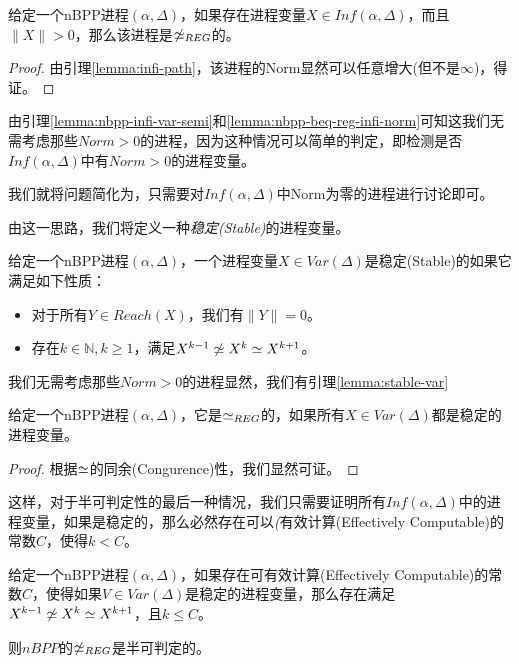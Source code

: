 \begin{lem}\label{lemma:nbpp-beq-reg-infi-norm}
给定一个nBPP进程$(\alpha,\Delta)$，如果存在进程变量$X\in Inf(\alpha,\Delta)$，而且$\|X\|>0$，那么该进程是$\not\simeq_{REG}$的。
\end{lem}

\begin{proof}
由引理\ref{lemma:infi-path}，该进程的Norm显然可以任意增大(但不是$\infty$)，得证。
\end{proof}

由引理\ref{lemma:nbpp-infi-var-semi}和\ref{lemma:nbpp-beq-reg-infi-norm}可知这我们无需考虑那些$Norm>0$的进程，因为这种情况可以简单的判定，即检测是否$Inf(\alpha,\Delta)$中有$Norm>0$的进程变量。

我们就将问题简化为，只需要对$Inf(\alpha,\Delta)$中Norm为零的进程进行讨论即可。

由这一思路，我们将定义一种\emph{稳定(Stable)}的进程变量。

\begin{defn}\label{def:stable-var}
给定一个nBPP进程$(\alpha,\Delta)$，一个进程变量$X \in Var(\Delta)$是稳定(Stable)的如果它满足如下性质：
\begin{itemize}
	\item 对于所有$Y\in Reach(X)$，我们有$\|Y\|=0$。
	\item 存在$k\in \mathbb{N},k\geq 1$，满足$X^{k-1}\not\simeq X^k\simeq X^{k+1}$。
\end{itemize}
\end{defn}

我们无需考虑那些$Norm>0$的进程显然，我们有引理\ref{lemma:stable-var}

\begin{lem}\label{lemma:stable-var}
给定一个nBPP进程$(\alpha,\Delta)$，它是$\simeq_{REG}$的，如果所有$X\in Var(\Delta)$都是稳定的进程变量。
\end{lem}

\begin{proof}
根据$\simeq$的同余(Congurence)性，我们显然可证。
\end{proof}

这样，对于半可判定性的最后一种情况，我们只需要证明所有$Inf(\alpha,\Delta)$中的进程变量，如果是稳定的，那么必然存在可以\emph(有效计算(Effectively Computable)的常数$C$，使得$k<C$。

\begin{lem}\label{lemma:term}
给定一个nBPP进程$(\alpha,\Delta)$，如果存在可有效计算(Effectively Computable)的常数$C$，使得如果$V\in Var(\Delta)$是稳定的进程变量，那么存在满足$X^{k-1}\not\simeq X^k\simeq X^{k+1}$，且$k\leq C$。

则$nBPP$的$\not\simeq_{REG}$是半可判定的。
\end{lem}

